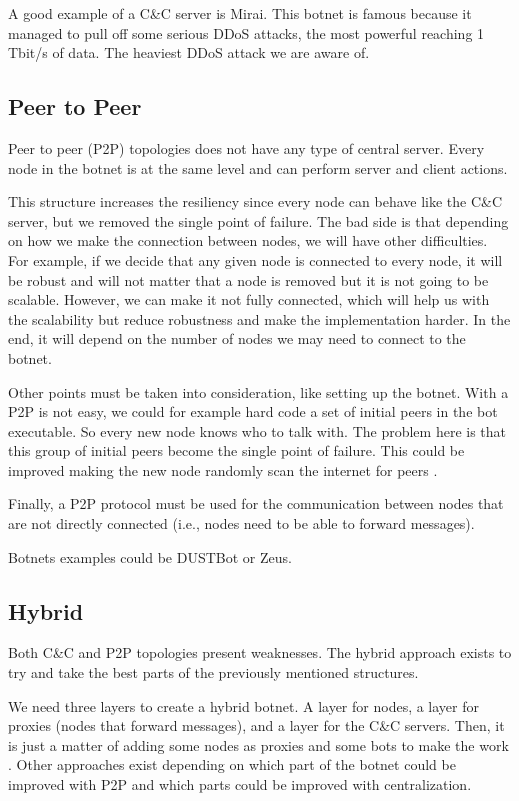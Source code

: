 \documentclass[11pt, a4paper,twoside]{tesi_upf}
\begin{document}
A good example of a C\&C server is Mirai. This botnet is famous because it managed to pull off some serious DDoS attacks, the most powerful reaching 1 Tbit/s of data. The heaviest DDoS attack we are aware of.

\subsection{Peer to Peer}

Peer to peer (P2P) topologies does not have any type of central server. Every node in the botnet is at the same level and can perform server and client actions.

This structure increases the resiliency since every node can behave like the C\&C server, but we removed the single point of failure.
The bad side is that depending on how we make the connection between nodes, we will have other difficulties. For example, if we decide that any given node is connected to every node, it will be robust and will not matter that a node is removed but it is not going to be scalable. However, we can make it not fully connected, which will help us with the scalability but reduce robustness and make the implementation harder. In the end, it will depend on the number of nodes we may need to connect to the botnet.

Other points must be taken into consideration, like setting up the botnet. With a P2P is not easy, we could for example hard code a set of initial peers in the bot executable. So every new node knows who to talk with. The problem here is that this group of initial peers become the single point of failure. This could be improved making the new node randomly scan the internet for peers \cite{botnets}.

Finally, a P2P protocol must be used for the communication between nodes that are not directly connected (i.e., nodes need to be able to forward messages).

Botnets examples could be DUSTBot or Zeus.

\subsection{Hybrid}

Both C\&C and P2P topologies present weaknesses. The hybrid approach exists to try and take the best parts of the previously mentioned structures.

We need three layers to create a hybrid botnet. A layer for nodes, a layer for proxies (nodes that forward messages), and a layer for the C\&C servers. Then, it is just a matter of adding some nodes as proxies and some bots to make the work \cite{botnets}. Other approaches exist depending on which part of the botnet could be improved with P2P and which parts could be improved with centralization.
\end{document}
